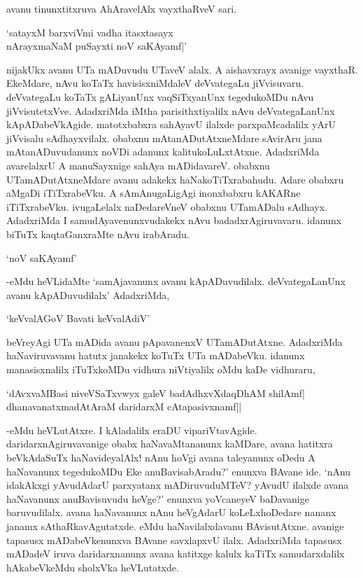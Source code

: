 avanu tinunxtitxruva AhAravelAlx vayxthaRveV sari.

\begin{shloka}
`satayxM barxviVmi vadha itasxtasayx\\
nArayxmaNaM puSayxti noV saKAyamf|'
\end{shloka}

nijakUkx avanu UTa mADuvudu UTaveV alalx. A aishavxrayx avanige vayxthaR. EkeMdare, nAvu koTaTx havisisxniMdaleV deVvategaLu jiVvisuvaru. deVvategaLu koTaTx gALiyanUnx vaqSiTxyanUnx tegedukoMDu nAvu jiVvisutetxVve. AdadxriMda iMtha parisithxtiyalilx nAvu deVvategaLanUnx kApADabeVkAgide. matotxbabxra sahAyavU ilalxde parxpaMcadalilx yArU jiVvisalu sAdhayxvilalx. obabxnu mAtanADutAtxneMdare sAvirAru jana mAtanADuvudanunx noVDi adanunx kalitukoLuLxtAtxne. AdadxriMda avarelalxrU A manuSayxnige sahAya mADidavareV. obabxnu UTamADutAtxneMdare avanu adakekx haNakoTiTxrabahudu. Adare obabxru aMgaDi iTiTxrabeVku. A sAmAnugaLigAgi inonxbabxru kAKARne iTiTxrabeVku. ivugaLelalx naDedareVneV obabxnu UTamADalu sAdhayx. AdadxriMda I samudAyavenunxvudakekx nAvu badadxrAgiruvavaru. idanunx biTuTx kaqtaGanxraMte nAvu irabAradu.

\begin{shloka}
`noV saKAyamf'
\end{shloka}

-eMdu heVLidaMte `samAjavanunx avanu kApADuvudilalx. deVvategaLanUnx avanu kApADuvudilalx' AdadxriMda,

\begin{shloka}
`keVvalAGoV Bavati keVvalAdiV'
\end{shloka}

beVreyAgi UTa mADida avanu pApavanenxV UTamADutAtxne. AdadxriMda haNaviruvavanu hatutx janakekx koTuTx UTa mADabeVku. idanunx manasisxnalilx iTuTxkoMDu vidhura niVtiyalilx oMdu kaDe vidhuraru,

\begin{shloka}
`dAvxvaMBasi niveVSaTxvwyx galeV badAdhxvXdaqDhAM shilAmf|\\
dhanavanatxmadAtAraM daridarxM cAtapasivxnamf||
\end{shloka}

-eMdu heVLutAtxre. I kAladalilx eraDU vipariVtavAgide. daridarxnAgiruvavanige obabx haNavaMtananunx kaMDare, avana hatitxra beVkAdaSuTx haNavideyalAlx! nAnu hoVgi avana taleyanunx oDedu A haNavanunx tegedukoMDu Eke anuBavisabAradu?' enunxva BAvane ide. `nAnu idakAkxgi yAvudAdarU parxyatanx mADiruvuduMTeV? yAvudU ilalxde avana haNavanunx anuBavisuvudu heVge?' enunxva yoVcaneyeV baDavanige baruvudilalx. avana haNavanunx nAnu heVgAdarU koLeLxhoDedare nananx janamx sAthaRkavAgutatxde. eMdu haNavilalxdavanu BAvisutAtxne. avanige tapasusx mADabeVkenunxva BAvane savxlapxvU ilalx. AdadxriMda tapasusx mADadeV iruva daridarxnanunx avana katitxge kalulx kaTiTx samudarxdalilx hAkabeVkeMdu sholxVka heVLutatxde.

